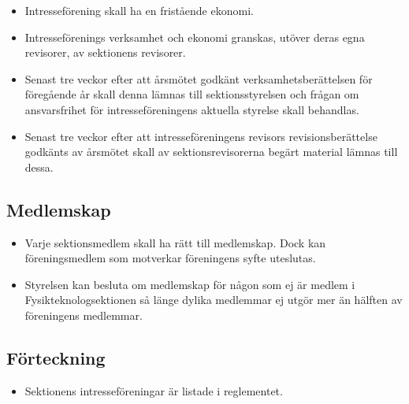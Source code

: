 \documentclass[11pt,a4paper]{article}
\begin{document}
\begin{itemize}

  \item Intresseförening skall ha en fristående ekonomi.

  \item Intresseförenings verksamhet och ekonomi granskas, utöver deras egna revisorer, av
  sektionens revisorer.

  \item Senast tre veckor efter att årsmötet godkänt verksamhetsberättelsen för föregående år skall denna lämnas till sektionsstyrelsen och frågan om ansvarsfrihet för intresseföreningens aktuella styrelse skall behandlas.
  
  \item{Senast tre veckor efter att intresseföreningens revisors revisionsberättelse godkänts av årsmötet skall av sektionsrevisorerna begärt material lämnas till dessa.}

\end{itemize}

\subsection{Medlemskap}

\begin{itemize}

  \item Varje sektionsmedlem skall ha rätt till medlemskap. Dock kan
  förenings\-med\-lem som motverkar föreningens syfte uteslutas.
  
  \item Styrelsen kan besluta om medlemskap för någon som ej är medlem i Fysikteknologsektionen så länge dylika medlemmar ej utgör mer än hälften av föreningens medlemmar.
  

\end{itemize}

\subsection{Förteckning}

\begin{itemize}

  \item Sektionens intresseföreningar är listade i reglementet.

\end{itemize}

\newpage

\end{document}
